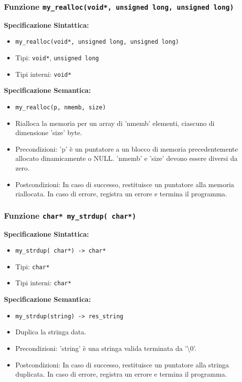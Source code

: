 \documentclass[11pt]{scrartcl} %
\begin{document}
\subsubsection{Funzione \texttt{my\_realloc(void*, unsigned long, unsigned long)}}

\textbf{Specificazione Sintattica:}
\begin{itemize}
	\item \texttt{my\_realloc(void*, unsigned long, unsigned long)}
	\item Tipi: \texttt{void*}, \texttt{unsigned long}
	\item Tipi interni: \texttt{void*}
\end{itemize}

\textbf{Specificazione Semantica:}
\begin{itemize}
	\item \texttt{my\_realloc(p, nmemb, size)}
	\item Rialloca la memoria per un array di 'nmemb' elementi, ciascuno di dimensione 'size' byte.
	\item Precondizioni: 'p' è un puntatore a un blocco di memoria precedentemente allocato dinamicamente o NULL. 'nmemb' e 'size' devono essere diversi da zero.
	\item Postcondizioni: In caso di successo, restituisce un puntatore alla memoria riallocata. In caso di errore, registra un errore e termina il programma.
\end{itemize}

\subsubsection{Funzione \texttt{char* my\_strdup( char*)}}

\textbf{Specificazione Sintattica:}
\begin{itemize}
	\item \texttt{my\_strdup( char*) -> char*}
	\item Tipi: \texttt{char*}
	\item Tipi interni: \texttt{char*}
\end{itemize}

\textbf{Specificazione Semantica:}
\begin{itemize}
	\item \texttt{my\_strdup(string) -> res\_string}
	\item Duplica la stringa data.
	\item Precondizioni: 'string' è una stringa valida terminata da '\textbackslash0'.
	\item Postcondizioni: In caso di successo, restituisce un puntatore alla stringa duplicata. In caso di errore, registra un errore e termina il programma.
\end{itemize}
\end{document}
